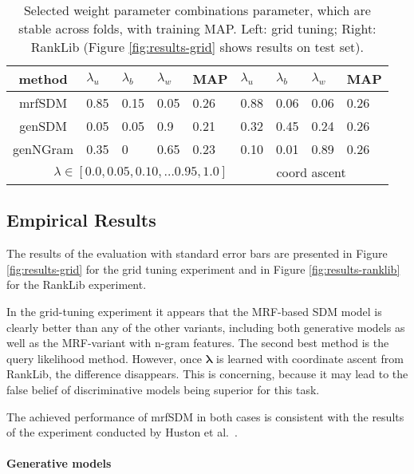 \documentclass[]{article}
\providecommand{\tabularnewline}{\\}
\begin{document}
\begin{table}
\caption{Selected weight parameter combinations parameter, which are stable
across folds, with training MAP. Left: grid tuning; Right: RankLib
(Figure \ref{fig:results-grid} shows results on test set).\label{tab:tuning-lambda}}

\noindent \centering{}{\scriptsize{}}%
\begin{tabular}{c@{\hskip 1em}llll@{\hskip 3em}llll}
\toprule 
{method} & {$\lambda_{u}$} & {$\lambda_{b}$} & {$\lambda_{w}$} & {MAP} & {$\lambda_{u}$} & {$\lambda_{b}$} & {$\lambda_{w}$} & {MAP}\tabularnewline
\midrule
{mrfSDM} & {0.85} & {0.15} & {0.05} & { 0.26} & {0.88} & {0.06} & {0.06} & {0.26}\tabularnewline
{genSDM} & {0.05} & {0.05} & {0.9} & { 0.21} & {0.32} & {0.45} & {0.24} & {0.26}\tabularnewline
{genNGram} & {0.35} & {0} & {0.65} & { 0.23} & {0.10} & {0.01} & {0.89} & {0.26}\tabularnewline
\bottomrule
\multicolumn{5}{r}{{\scriptsize{}$\lambda\in[0.0,0.05,0.10,\dots0.95,1.0]$}} & \multicolumn{4}{c}{coord ascent}\tabularnewline
\end{tabular}{\scriptsize \par}
\end{table}


\subsection{Empirical Results}

The results of the evaluation with standard error bars are presented
in Figure \ref{fig:results-grid} for the grid tuning experiment and
in Figure \ref{fig:results-ranklib} for the RankLib experiment. 

In the grid-tuning experiment it appears that the MRF-based SDM model is clearly better
than any of the other variants, including both generative models as
well as the MRF-variant with n-gram features. The second best method
is the query likelihood method. However, once $\boldsymbol{\lambda}$
is learned with coordinate ascent from RankLib, the difference disappears. This is concerning, because it may lead to the false belief of discriminative models being superior for this task.

The achieved performance of mrfSDM in both cases is consistent with
the results of the experiment conducted by Huston et al.~\cite{huston2013termdependencies}.

\paragraph{Generative models}
\end{document}
